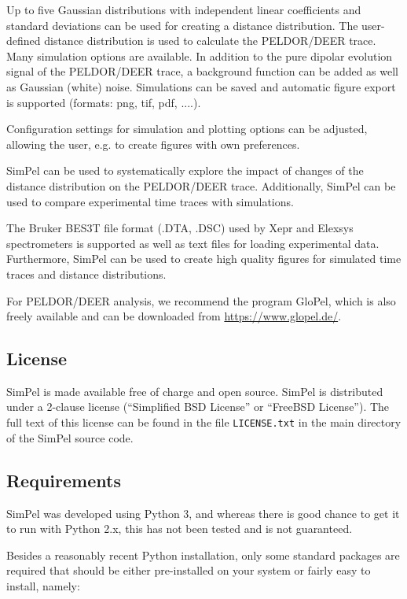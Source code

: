 \documentclass[pdftex,bezier,german,a4,twoside, headexclude,12pt,nochapterprefix, titlepage]{extarticle}
\newcommand{\simpel}{\textsf{SimPel}}
\begin{document}
Up to five Gaussian distributions with independent linear coefficients and standard deviations can be used for creating a distance distribution. The user-defined distance distribution is used to calculate the PELDOR/DEER trace. Many simulation options are available. In addition to the pure dipolar evolution signal of the PELDOR/DEER trace, a background function can be added as well as Gaussian (white) noise. Simulations can be saved and automatic figure export is supported (formats: png, tif, pdf, ....).

Configuration settings for simulation and plotting options can be adjusted, allowing the user, e.g. to create figures with own preferences.

\simpel{} can be used to systematically explore the impact of changes of the distance distribution on the PELDOR/DEER trace. Additionally, \simpel{} can be used to compare experimental time traces with simulations.

The Bruker BES3T file format (.DTA, .DSC) used by Xepr and Elexsys spectrometers
is supported as well as text files for loading experimental data. Furthermore, \simpel{} can be used to create high quality figures for simulated time traces and distance distributions.

For PELDOR/DEER analysis, we recommend the program GloPel, which is also freely available and can be downloaded from \url{https://www.glopel.de/}.

\subsection{License}

\simpel{} is made available free of charge and open source. 
\simpel{} is distributed under a 2-clause license (``Simplified BSD License'' or ``FreeBSD License''). The full text of this license can be found in the file \texttt{LICENSE.txt} in the main directory of the \simpel{} source code.


\subsection{Requirements}

\simpel{} was developed using Python 3, and whereas there is good chance to get it to run with Python 2.x, this has not been tested and is not guaranteed.

Besides a reasonably recent Python installation, only some standard packages are required that should be either pre-installed on your system or fairly easy to install, namely:
\end{document}
